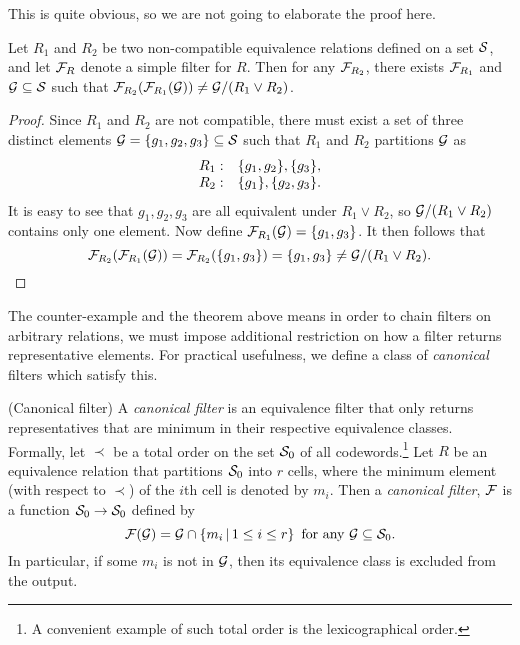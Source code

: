 This is quite obvious, so we are not going to elaborate the proof here.

\begin{theorem}
Let $R_1$ and $R_2$ be two non-compatible equivalence relations defined on a set $\mathcal{S}$, and let $\mathcal{F}_R$ denote a simple filter for $R$. Then for any $\mathcal{F}_{R_2}$, there exists $\mathcal{F}_{R_1}$ and $\mathcal{G} \subseteq \mathcal{S}$ such that $\mathcal{F}_{R_2}(\mathcal{F}_{R_1}(\mathcal{G})) \ne \mathcal{G} / (R_1 \vee R_2)$.
\end{theorem}

\begin{proof}
Since $R_1$ and $R_2$ are not compatible, there must exist a set of three distinct elements $\mathcal{G} = \{ g_1, g_2, g_3 \} \subseteq \mathcal{S}$ such that $R_1$ and $R_2$ partitions $\mathcal{G}$ as
\[
\begin{array}{ r l }
R_1: & \{ g_1, g_2 \}, \{ g_3 \} , \\
R_2: & \{ g_1 \}, \{ g_2, g_3 \} .
\end{array}
\]
It is easy to see that $g_1, g_2, g_3$ are all equivalent under $R_1 \vee R_2$, so $\mathcal{G} / (R_1 \vee R_2)$ contains only one element.
Now define $\mathcal{F}_{R_1} (\mathcal{G}) = \{ g_1, g_3 \}$. It then follows that
\[
\mathcal{F}_{R_2}(\mathcal{F}_{R_1}(\mathcal{G})) = \mathcal{F}_{R_2}(\{ g_1, g_3 \}) = \{ g_1, g_3 \} \ne \mathcal{G} / (R_1 \vee R_2) .
\]
\end{proof}


The counter-example and the theorem above means in order to chain filters on arbitrary relations, we must impose additional restriction on how a filter returns representative elements. For practical usefulness, we define a class of \emph{canonical} filters which satisfy this.

\begin{definition}
(Canonical filter) A \emph{canonical filter} is an equivalence filter that only returns representatives that are minimum in their respective equivalence classes. Formally, let $\prec$ be a total order on the set $\mathcal{S}_0$ of all codewords.\footnote{A convenient example of such total order is the lexicographical order.}
Let $R$ be an equivalence relation that partitions $\mathcal{S}_0$ into $r$ cells, where the minimum element (with respect to $\prec$) of the $i$th cell is denoted by $m_i$. Then a \emph{canonical filter}, $\mathcal{F}$ is a function $\mathcal{S}_0 \rightarrow \mathcal{S}_0$ defined by
\begin{equation}
\mathcal{F}(\mathcal{G}) = \mathcal{G} \cap \left\{ m_i \,|\, 1 \le i \le r \right\} \text{ for any } \mathcal{G} \subseteq \mathcal{S}_0 . \label{eq:canonical-filter-1}
\end{equation}
In particular, if some $m_i$ is not in $\mathcal{G}$, then its equivalence class is excluded from the output.
\end{definition}

